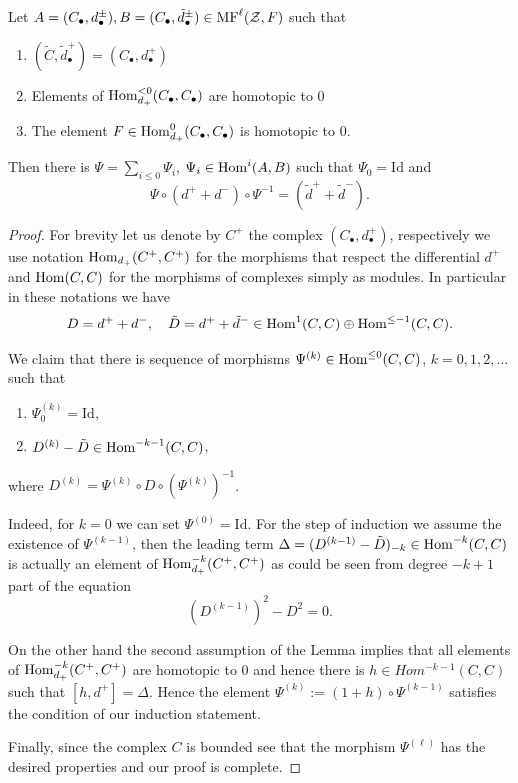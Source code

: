 \documentclass[10pt]{amsart}
\begin{document}
\begin{lemma}\label{lem: ext uniq} Let $A=(C_\bullet,d^\pm_\bullet), B=(C_\bullet,\tilde{d}^\pm_\bullet)\in \mathrm{MF}^{\ell}(\mathcal{Z},F)$ such that
\begin{enumerate}
\item $(\tilde{C},\tilde{d}^+_\bullet)=(C_\bullet,d^+_\bullet)$
\item Elements of $\mathop{{\rm Hom}}\nolimits_{d_+}^{<0}(C_\bullet,C_\bullet)$ are homotopic to $0$
\item The element $F\in \mathop{{\rm Hom}}\nolimits_{d_+}^{0}(C_\bullet,C_\bullet)$ is homotopic to $0$.
\end{enumerate}
Then there is $\Psi=\sum_{i\le 0}\Psi_i$, $\Psi_i\in \mathop{{\rm Hom}}\nolimits^{i}(A,B)$ such that $\Psi_0=\mathrm{Id}$ and
$$ \Psi\circ (d^++d^-)\circ \Psi^{-1}=(\tilde{d}^++\tilde{d}^-).$$
\end{lemma}
\begin{proof}

For brevity let us denote by $C^+$ the complex $(C_\bullet,d^+_\bullet)$, respectively we use notation
$\mathop{{\rm Hom}}\nolimits_{d_+}(C^+,C^+)$ for the morphisms that respect the differential $d^+$ and $\mathop{{\rm Hom}}\nolimits(C,C)$ for the morphisms
of complexes simply as modules. In particular in these notations we have
$$ D=d^++d^-,\quad  \tilde{D}=d^++\tilde{d}^-\in \mathop{{\rm Hom}}\nolimits^{1}(C,C)\oplus \mathop{{\rm Hom}}\nolimits^{\le -1}(C,C).$$

We claim that there is sequence of morphisms $\Psi^{(k)}\in \mathop{{\rm Hom}}\nolimits^{\le 0}(C,C)$, $k=0,1,2,\dots$ such that
\begin{enumerate}
\item $\Psi^{(k)}_0=\mathrm{Id}$,
\item $D^{(k)}-\tilde{D}\in \mathop{{\rm Hom}}\nolimits^{-k-1}(C,C)$,
\end{enumerate}
where $D^{(k)}=\Psi^{(k)}\circ D\circ (\Psi^{(k)})^{-1}$.

Indeed, for $k=0$ we can set $\Psi^{(0)}=\mathrm{Id}$. For the step of induction we assume the existence of $\Psi^{(k-1)}$, then
the leading term $\Delta=(D^{(k-1)}-\tilde{D})_{-k}\in \mathop{{\rm Hom}}\nolimits^{-k}(C,C)$ is actually an element of $\mathop{{\rm Hom}}\nolimits_{d_+}^{-k}(C^+,C^+)$ as could be seen from
degree $-k+1$ part of the equation
$$ (D^{(k-1)})^2-D^2=0.$$

On the other hand the second assumption of the Lemma implies that all elements of $\mathop{{\rm Hom}}\nolimits_{d_+}^{-k}(C^+,C^+)$ are homotopic to $0$ and
hence there is $h\in Hom^{-k-1}(C,C)$ such that $[h,d^+]=\Delta$. Hence the element $\Psi^{(k)}:=(1+h)\circ \Psi^{(k-1)}$ satisfies the condition of
our induction statement.

Finally, since the complex $C$ is bounded see that the morphism $\Psi^{(\ell)}$ has the desired properties and our proof is complete.
\end{proof}
\end{document}

